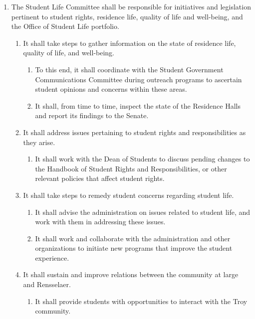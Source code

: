\documentclass{bylaws}
\begin{document}
\begin{enumerate}
\item The Student Life Committee shall be responsible for initiatives and legislation pertinent to student rights, residence life,
quality of life and well-being, and the Office of Student Life portfolio.
\begin{enumerate}
\item It shall take steps to gather information on the state of residence life, quality of life, and well-being.
\begin{enumerate}
\item To this end, it shall coordinate with the Student Government Communications Committee during outreach programs to
ascertain student opinions and concerns within these areas.
\item It shall, from time to time, inspect the state of the Residence Halls and report its findings to the Senate.
\end{enumerate}
\item It shall address issues pertaining to student rights and responsibilities as they arise.
\begin{enumerate}
\item It shall work with the Dean of Students to discuss pending changes to the Handbook of Student Rights and
Responsibilities, or other relevant policies that affect student rights.
\end{enumerate}
\item It shall take steps to remedy student concerns regarding student life.
\begin{enumerate}
\item It shall advise the administration on issues related to student life, and work with them in addressing these issues.
\item It shall work and collaborate with the administration and other organizations to initiate new programs that improve the
student experience.
\end{enumerate}
\item It shall sustain and improve relations between the community at large and Rensselaer.
\begin{enumerate}
\item It shall provide students with opportunities to interact with the Troy community.
\end{enumerate}
\end{enumerate}


\end{enumerate}
\end{document}

